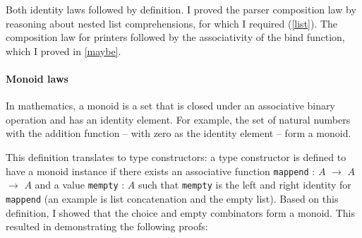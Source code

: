 \documentclass[12pt,a4paper,twoside,openright]{report}
\newcommand{\F}{\AgdaFunction}
\begin{document}
{Both identity laws followed by definition. I proved the parser composition law by reasoning about nested list comprehensions, for which I required \F{>\!\!>\!=$_l$-map} (\autoref{list}). The composition law for printers followed by the associativity of the \F{Maybe} bind function, which I proved in \autoref{maybe}.

\paragraph{Monoid laws}

In mathematics, a monoid is a set that is closed under an associative binary operation and has an identity element. For example, the set of natural numbers with the addition function -- with zero as the identity element -- form a monoid.

This definition translates to type constructors: a type constructor is defined to have a monoid instance if there exists an associative function {\tt mappend} : {$A$} $\to$  $A$ $\to$  $A$ and a value {\tt mempty} : {$A$} such that {\tt mempty} is the left and right identity for {\tt mappend} (an example is list concatenation and the empty list). Based on this definition, I showed that the choice and empty combinators form a monoid. This resulted in demonstrating the following proofs:

}
\end{document}
